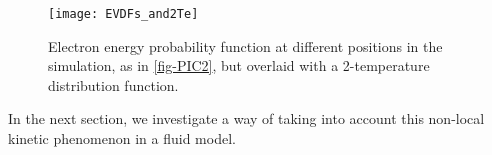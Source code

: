     \begin{figure}[!hbt]
      \centering
      \texttt{[image: EVDFs\_and2Te]}
      \caption{Electron energy probability function at different positions in the simulation, as in \cref{fig-PIC2}, but overlaid with a 2-temperature distribution function.}
      \label{fig-PIC3}
    \end{figure}

    In the next section, we investigate a way of taking into account this non-local kinetic phenomenon in a fluid model.
